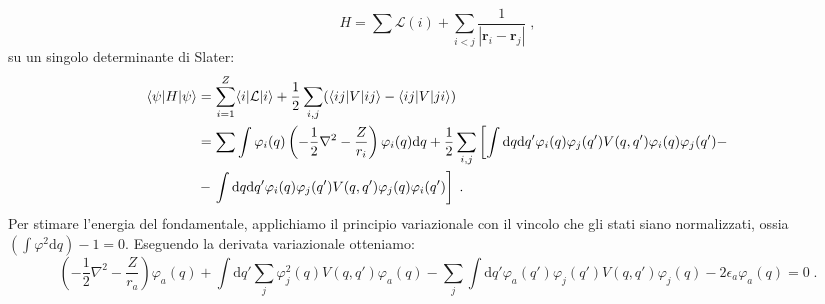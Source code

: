 \documentclass[10pt,a4paper]{report}
\theoremstyle{definition}
\newcommand{\lag}{\mathcal{L}}
\numberwithin{equation}{section}
\newcommand{\diff}[1][]{\mathrm{d}#1}
\newcommand{\bra}{\langle}
\newcommand{\ket}{\rangle}
\begin{document}
\begin{equation}
H=\sum \lag(i)+\sum_{i<j}\frac{1}{|\mathbf{r}_i-\mathbf{r}_j|}\;,
\end{equation}
su un singolo determinante di Slater:
\begin{align}
\bra\psi|H|\psi\ket &= \sum_{i=1}^Z\bra i|\lag|i\ket+\frac{1}{2}\sum_{i,j}(\bra ij|V|ij\ket-\bra ij|V|ji\ket) \notag \\
&= \sum \int\varphi_i(q)\left(-\frac{1}{2}\nabla^2-\frac{Z}{r_i}\right)\varphi_i(q)\diff{q}+\frac{1}{2}\sum_{i,j}\left[\int\diff{q}\diff{q'}\varphi_i(q)\varphi_j(q')V(q,q')\varphi_i(q)\varphi_j(q')-\right. \notag \\
&-\left.\int \diff{q}\diff{q'}\varphi_i(q)\varphi_j(q')V(q,q')\varphi_j(q)\varphi_i(q')\right]\;.
\end{align}
Per stimare l'energia del fondamentale, applichiamo il principio variazionale con il vincolo che gli stati siano normalizzati, ossia $\left(\int\varphi^2\diff{q}\right)-1=0$. Eseguendo la derivata variazionale otteniamo:
\begin{equation}
\left(-\frac{1}{2}\nabla^2-\frac{Z}{r_a}\right)\varphi_a(q)+\int\diff{q'}\sum_j \varphi_j^2(q)V(q,q')\varphi_a(q)-\sum_j\int\diff{q'}\varphi_a(q')\varphi_j(q')V(q,q')\varphi_j(q)-2\epsilon_a\varphi_a(q)=0\;.
\end{equation}
\end{document}
